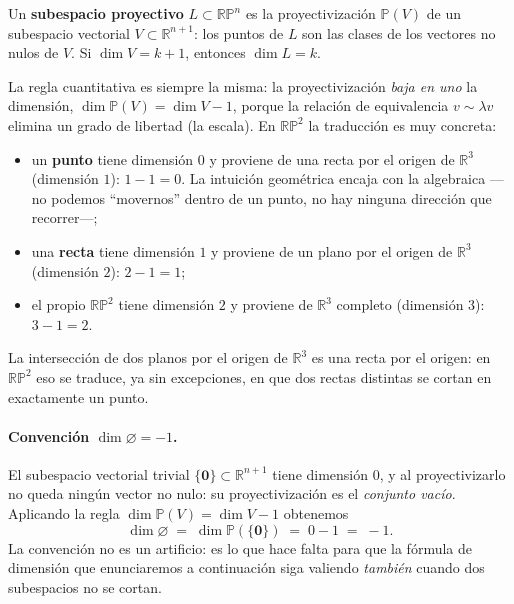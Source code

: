 \documentclass[11pt,a4paper]{article}
\newcommand{\RP}{\mathbb{RP}}
\newcommand{\R}{\mathbb{R}}
\begin{document}
\begin{defbox}
Un \textbf{subespacio proyectivo} $L\subset\RP^n$ es la proyectivización
$\mathbb P(V)$ de un subespacio vectorial $V\subset\R^{n+1}$: los puntos
de $L$ son las clases de los vectores no nulos de $V$. Si $\dim V=k+1$,
entonces $\dim L = k$.
\end{defbox}
\noindent La regla cuantitativa es siempre la misma: la proyectivización
\emph{baja en uno} la dimensión, $\dim\mathbb P(V)=\dim V-1$, porque la
relación de equivalencia $v\sim\lambda v$ elimina un grado de libertad
(la escala). En $\RP^2$ la traducción es muy concreta:
\begin{itemize}[leftmargin=1.4em,itemsep=1pt]
\item un \textbf{punto} tiene dimensión $0$ y proviene de una recta por
  el origen de $\R^3$ (dimensión $1$): $1-1=0$. La intuición geométrica
  encaja con la algebraica —no podemos ``movernos'' dentro de un punto, no
  hay ninguna dirección que recorrer—;
\item una \textbf{recta} tiene dimensión $1$ y proviene de un plano por
  el origen de $\R^3$ (dimensión $2$): $2-1=1$;
\item el propio $\RP^2$ tiene dimensión $2$ y proviene de $\R^3$ completo
  (dimensión $3$): $3-1=2$.
\end{itemize}
La intersección de dos planos por el origen de $\R^3$ es una recta por el
origen: en $\RP^2$ eso se traduce, ya sin excepciones, en que dos rectas
distintas se cortan en exactamente un punto.

\paragraph{Convención $\dim\varnothing=-1$.}
El subespacio vectorial trivial $\{\mathbf 0\}\subset\R^{n+1}$ tiene
dimensión $0$, y al proyectivizarlo no queda ningún vector no nulo: su
proyectivización es el \emph{conjunto vacío}. Aplicando la regla
$\dim\mathbb P(V)=\dim V-1$ obtenemos
\[
  \dim\varnothing \;=\; \dim\mathbb P(\{\mathbf 0\})
  \;=\; 0-1 \;=\; -1.
\]
La convención no es un artificio: es lo que hace falta para que la
fórmula de dimensión que enunciaremos a continuación siga valiendo
\emph{también} cuando dos subespacios no se cortan.
\end{document}
